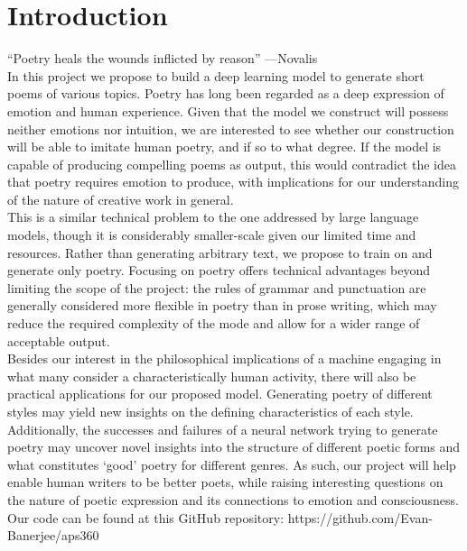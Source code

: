 \documentclass{article} %
\begin{document}
\section{Introduction}
“Poetry heals the wounds inflicted by reason” —Novalis\\

In this project we propose to build a deep learning model to generate short poems of various topics. 
Poetry has long been regarded as a deep expression of emotion and human experience. 
Given that the model we construct will possess neither emotions nor intuition, 
we are interested to see whether our construction will be able to imitate human poetry, 
and if so to what degree. If the model is capable of producing compelling poems as output, 
this would contradict the idea that poetry requires emotion to produce, 
with implications for our understanding of the nature of creative work in general.\\

This is a similar technical problem to the one addressed by large language models,
though it is considerably smaller-scale given our limited time and resources. Rather than generating arbitrary text,
we propose to train on and generate only poetry. Focusing on poetry offers technical advantages beyond limiting the scope of the project: 
the rules of grammar and punctuation are generally considered more flexible in poetry than in prose writing,
which may reduce the required complexity of the mode and allow for a wider range of acceptable output.\\

Besides our interest in the philosophical implications of a machine engaging in what many consider a characteristically human activity,
there will also be practical applications for our proposed model.
Generating poetry of different styles may yield new insights on the defining characteristics of each style. 
Additionally, the successes and failures of a neural network trying to generate poetry may uncover novel insights into the structure of different poetic forms and what constitutes ‘good’ poetry for different genres.
As such, our project will help enable human writers to be better poets, while raising interesting questions on the nature of poetic expression and its connections to emotion and consciousness.\\

Our code can be found at this GitHub repository: https://github.com/Evan-Banerjee/aps360
\end{document}
